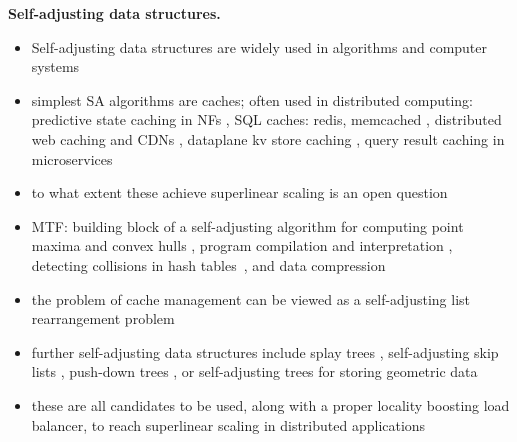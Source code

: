 \noindent%
\textbf{Self-adjusting data structures.} %
\begin{itemize}
\item Self-adjusting data structures are widely used in algorithms and computer systems
\item simplest SA algorithms are caches; often used in distributed computing: predictive state caching in NFs \cite{295537}, SQL caches: redis, memcached \cite{10.5555/1012889.1012894, 180324}, distributed web caching and CDNs \cite{295603}, dataplane kv store caching \cite{ghigoff2021bmc}, query result caching in microservices \cite{295493}
\item to what extent these achieve superlinear scaling is an open question
\item MTF: building block of a self-adjusting algorithm for computing point maxima and convex hulls \cite{BentleyCL93}, program compilation and interpretation \cite{HesterH85}, detecting collisions in hash tables~\cite{HesterH85}, and data compression \cite{BentleySTW86}
\item the problem of cache management can be viewed as a self-adjusting list rearrangement problem \cite{SleatorT85}
\item further self-adjusting data structures include splay trees \cite{SleatorT85Splay}, self-adjusting skip lists \cite{BoseDL08}, push-down trees \cite{Avin0020}, or self-adjusting trees for storing geometric data \cite{ParkM12}
\item these are all candidates to be used, along with a proper locality boosting load balancer, to reach superlinear scaling in distributed applications
\end{itemize}




